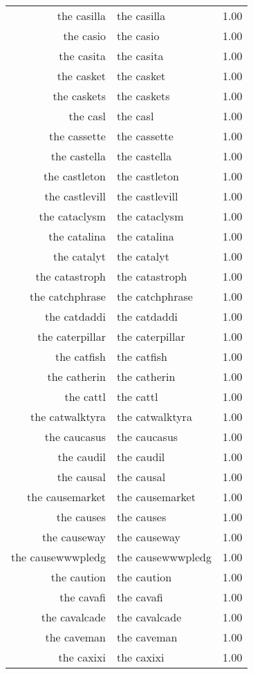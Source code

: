 \begin{table}[ht]
\begin{tabular}{rlr}
  the casilla & the casilla & 1.00 \\ 
  the casio & the casio & 1.00 \\ 
  the casita & the casita & 1.00 \\ 
  the casket & the casket & 1.00 \\ 
  the caskets & the caskets & 1.00 \\ 
  the casl & the casl & 1.00 \\ 
  the cassette & the cassette & 1.00 \\ 
  the castella & the castella & 1.00 \\ 
  the castleton & the castleton & 1.00 \\ 
  the castlevill & the castlevill & 1.00 \\ 
  the cataclysm & the cataclysm & 1.00 \\ 
  the catalina & the catalina & 1.00 \\ 
  the catalyt & the catalyt & 1.00 \\ 
  the catastroph & the catastroph & 1.00 \\ 
  the catchphrase & the catchphrase & 1.00 \\ 
  the catdaddi & the catdaddi & 1.00 \\ 
  the caterpillar & the caterpillar & 1.00 \\ 
  the catfish & the catfish & 1.00 \\ 
  the catherin & the catherin & 1.00 \\ 
  the cattl & the cattl & 1.00 \\ 
  the catwalktyra & the catwalktyra & 1.00 \\ 
  the caucasus & the caucasus & 1.00 \\ 
  the caudil & the caudil & 1.00 \\ 
  the causal & the causal & 1.00 \\ 
  the causemarket & the causemarket & 1.00 \\ 
  the causes & the causes & 1.00 \\ 
  the causeway & the causeway & 1.00 \\ 
  the causewwwpledg & the causewwwpledg & 1.00 \\ 
  the caution & the caution & 1.00 \\ 
  the cavafi & the cavafi & 1.00 \\ 
  the cavalcade & the cavalcade & 1.00 \\ 
  the caveman & the caveman & 1.00 \\ 
  the caxixi & the caxixi & 1.00 \\ 

\end{tabular}
\end{table}
